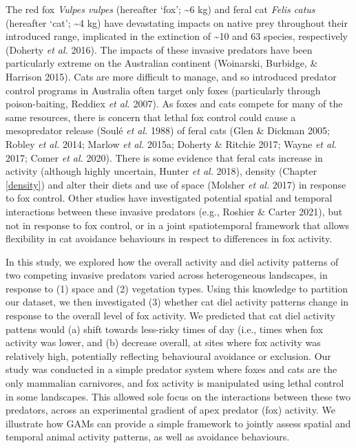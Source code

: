 \documentclass[11pt,a4paper,titlepage,twoside,openright]{style/unimelbthesis}
\begin{document}
\begin{mainmatter}
The red fox \emph{Vulpes vulpes} (hereafter `fox'; \textasciitilde6 kg) and feral cat \emph{Felis catus} (hereafter `cat'; \textasciitilde4 kg) have devastating impacts on native prey throughout their introduced range, implicated in the extinction of \textasciitilde10 and 63 species, respectively (Doherty \emph{et al.} 2016). The impacts of these invasive predators have been particularly extreme on the Australian continent (Woinarski, Burbidge, \& Harrison 2015). Cats are more difficult to manage, and so introduced predator control programs in Australia often target only foxes (particularly through poison-baiting, Reddiex \emph{et al.} 2007). As foxes and cats compete for many of the same resources, there is concern that lethal fox control could cause a mesopredator release (Soulé \emph{et al.} 1988) of feral cats (Glen \& Dickman 2005; Robley \emph{et al.} 2014; Marlow \emph{et al.} 2015a; Doherty \& Ritchie 2017; Wayne \emph{et al.} 2017; Comer \emph{et al.} 2020). There is some evidence that feral cats increase in activity (although highly uncertain, Hunter \emph{et al.} 2018), density (Chapter \ref{density}) and alter their diets and use of space (Molsher \emph{et al.} 2017) in response to fox control. Other studies have investigated potential spatial and temporal interactions between these invasive predators (e.g., Roshier \& Carter 2021), but not in response to fox control, or in a joint spatiotemporal framework that allows flexibility in cat avoidance behaviours in respect to differences in fox activity.

In this study, we explored how the overall activity and diel activity patterns of two competing invasive predators varied across heterogeneous landscapes, in response to (1) space and (2) vegetation types. Using this knowledge to partition our dataset, we then investigated (3) whether cat diel activity patterns change in response to the overall level of fox activity. We predicted that cat diel activity pattens would (a) shift towards less-risky times of day (i.e., times when fox activity was lower, and (b) decrease overall, at sites where fox activity was relatively high, potentially reflecting behavioural avoidance or exclusion. Our study was conducted in a simple predator system where foxes and cats are the only mammalian carnivores, and fox activity is manipulated using lethal control in some landscapes. This allowed sole focus on the interactions between these two predators, across an experimental gradient of apex predator (fox) activity. We illustrate how GAMs can provide a simple framework to jointly assess spatial and temporal animal activity patterns, as well as avoidance behaviours.


\end{mainmatter}
\end{document}
